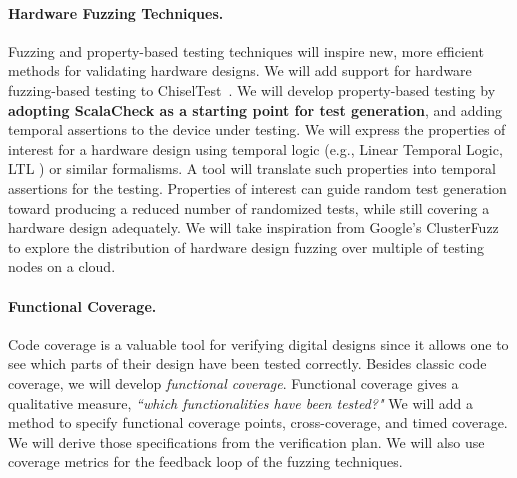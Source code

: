 \documentclass[fleqn,12pt]{article}
\begin{document}
\paragraph{Hardware Fuzzing Techniques.}

Fuzzing and property-based testing techniques will inspire new, more efficient methods for validating hardware designs.
We will add support for hardware fuzzing-based testing to ChiselTest~\cite{chisel:tester2}.
We will develop property-based testing by {\bf adopting ScalaCheck as a starting point for test generation}, and adding
temporal assertions to the {device under testing}.
We will express the properties of interest for a hardware design using temporal logic \cite{Baier2008} (e.g., Linear Temporal Logic, LTL \cite{Pnueli1977LTL}) or similar formalisms. A tool will translate such properties into
temporal assertions for the testing.
Properties of interest can guide random test generation {toward producing a reduced number of randomized tests, while still covering a hardware design adequately.}
We will take inspiration from Google's
ClusterFuzz~\cite{web:clusterfuzz}
to explore the distribution of hardware design fuzzing over multiple of testing nodes on a cloud.



\paragraph{Functional Coverage.}

Code coverage is a valuable tool for verifying digital designs
since it allows one to see which parts of their design have been tested correctly.
Besides classic code coverage, we will develop \emph{functional coverage}.
Functional coverage gives a qualitative measure, \textit{``which functionalities have been tested?"}
We will add a method to specify functional coverage points, cross-coverage, and timed
coverage. We will derive those specifications from the verification plan.
We will also use coverage metrics for the feedback loop of the fuzzing techniques.
\end{document}

